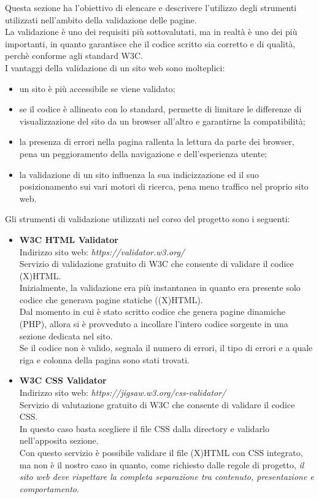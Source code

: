 Questa sezione ha l'obiettivo di elencare e descrivere l'utilizzo degli strumenti utilizzati nell'ambito della validazione delle pagine.\\ 
La validazione è uno dei requisiti più sottovalutati, ma in realtà è uno dei più importanti, in quanto garantisce che il codice scritto sia corretto e di qualità, perchè conforme agli standard W3C.\\
I vantaggi della validazione di un sito web sono molteplici:
\begin{itemize}
	\item un sito è più accessibile se viene validato;
	\item se il codice è allineato con lo standard, permette di limitare le differenze di visualizzazione del sito da un browser all'altro e garantirne la compatibilità;
	\item la presenza di errori nella pagina rallenta la lettura da parte dei browser, pena un peggioramento della navigazione e dell'esperienza utente;
	\item la validazione di un sito influenza la sua indicizzazione ed il suo posizionamento sui vari motori di ricerca, pena meno traffico nel proprio sito web.  
\end{itemize}
Gli strumenti di validazione utilizzati nel corso del progetto sono i seguenti:
\begin{itemize}
	\item \textbf{W3C HTML Validator}\\
	Indirizzo sito web: \emph{https://validator.w3.org/}\\
	Servizio di validazione gratuito di W3C che consente di validare il codice (X)HTML.\\ 
	Inizialmente, la validazione era più instantanea in quanto era presente solo codice che generava pagine statiche ((X)HTML).\\Dal momento in cui è stato scritto codice che genera pagine dinamiche (PHP), allora si è provveduto a incollare l'intero codice sorgente in una sezione dedicata nel sito.\\
	Se il codice non è valido, segnala il numero di errori, il tipo di errori e a quale riga e colonna della pagina sono stati trovati.
	\item \textbf{W3C CSS Validator}\\
	Indirizzo sito web: \emph{https://jigsaw.w3.org/css-validator/}\\
	Servizio di valutazione gratuito di W3C che consente di validare il codice CSS.\\
	In questo caso basta scegliere il file CSS dalla directory e validarlo nell'apposita sezione.\\
	Con questo servizio è possibile validare il file (X)HTML con CSS integrato, ma non è il nostro caso in quanto, come richiesto dalle regole di progetto, \emph{il sito web deve rispettare la completa separazione tra contenuto, presentazione e comportamento}. 
\end{itemize}

 